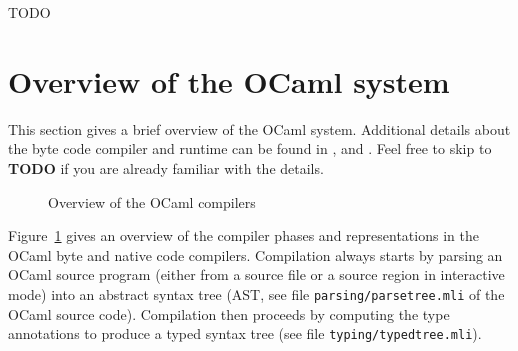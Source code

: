 \documentclass[10pt,a4paper,draft,twocolumn]{article}
\begin{document}
TODO


\section{Overview of the OCaml system} \label{section:Overview_of_the_OCaml_system}

This section gives a brief overview of the OCaml system. Additional details about the
byte code compiler and runtime can be found in \cite{Leroy90}, \cite{Meurer10ocamljit}
and \cite{Starynkevitch04}.
Feel free to skip to \textbf{TODO} if you are already familiar with the details.

\begin{figure}[htb]
  \centering
  \caption{Overview of the OCaml compilers}
  \label{fig:Overview_of_the_OCaml_compilers}
\end{figure}

Figure~\ref{fig:Overview_of_the_OCaml_compilers} gives an overview of the compiler phases
and representations in the OCaml byte and native code compilers. Compilation always starts
by parsing an OCaml source program (either from a source file or a source region in
interactive mode) into an abstract syntax tree (AST, see file \texttt{parsing/parsetree.mli}
of the OCaml source code). Compilation then proceeds by computing the type annotations to
produce a typed syntax tree (see file \texttt{typing/typedtree.mli}).
\end{document}
